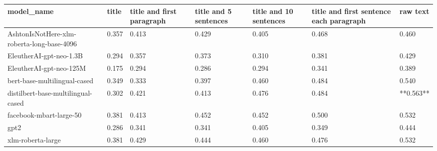 \begin{tabular}{lllllll}
\toprule
                                model\_name & title & title and first paragraph & title and 5 sentences & title and 10 sentences & title and first sentence each paragraph &  raw text \\
\midrule
AshtonIsNotHere-xlm-roberta-long-base-4096 & 0.357 &                     0.413 &                 0.429 &                  0.405 &                                   0.468 &     0.460 \\
                   EleutherAI-gpt-neo-1.3B & 0.294 &                     0.357 &                 0.373 &                  0.310 &                                   0.381 &     0.429 \\
                   EleutherAI-gpt-neo-125M & 0.175 &                     0.294 &                 0.286 &                  0.294 &                                   0.341 &     0.389 \\
              bert-base-multilingual-cased & 0.349 &                     0.333 &                 0.397 &                  0.460 &                                   0.484 &     0.540 \\
        distilbert-base-multilingual-cased & 0.302 &                     0.421 &                 0.413 &                  0.476 &                                   0.484 & **0.563** \\
                   facebook-mbart-large-50 & 0.381 &                     0.413 &                 0.452 &                  0.452 &                                   0.500 &     0.532 \\
                                      gpt2 & 0.286 &                     0.341 &                 0.341 &                  0.405 &                                   0.349 &     0.444 \\
                         xlm-roberta-large & 0.381 &                     0.429 &                 0.444 &                  0.460 &                                   0.476 &     0.532 \\
\bottomrule
\end{tabular}

